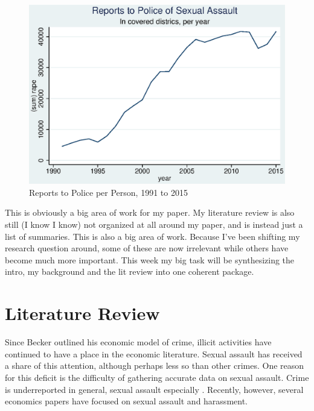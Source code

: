 \documentclass[AER,draftmode]{AEA}
\begin{document}
\begin{figure}

\includegraphics[]{figures/police_yearly_reports.eps}

\caption{Reports to Police per Person, 1991 to 2015} \label{figure:police_yearly}
\end{figure}


This is obviously a big area of work for my paper. My literature review is also still (I know I know) not organized at all around my paper, and is instead just a list of summaries. This is also a big area of work. Because I've been shifting my research question around, some of these are now irrelevant while others have become much more important. This week my big task will be synthesizing the intro, my background and the lit review into one coherent package.

\section{Literature Review}
Since Becker outlined his economic model of crime, illicit activities have continued to have a place in the economic literature. Sexual assault has received a share of this attention, although perhaps less so than other crimes. One reason for this deficit is the difficulty of gathering accurate data on sexual assault. Crime is underreported in general, sexual assault especially \cite{kilpatrick_drug-facilitated_2007} \cite{fisher_sexual_2000}. Recently, however, several economics papers have focused on sexual assault and harassment. 
\end{document}
